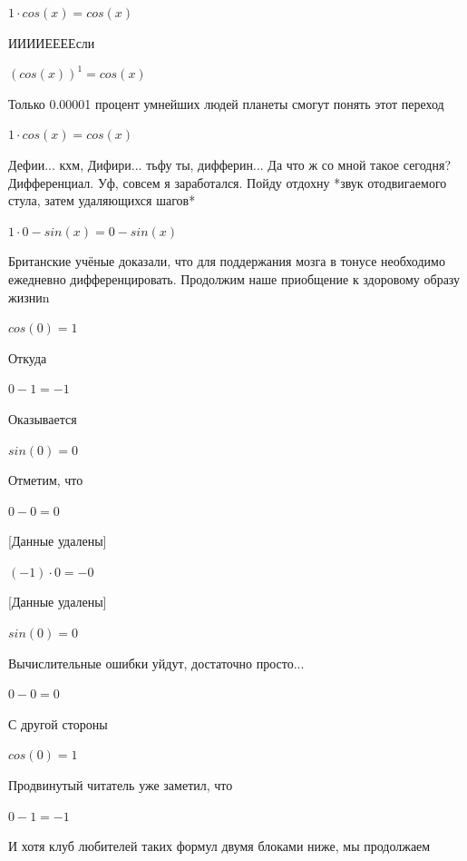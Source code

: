 \documentclass[12pt,a4paper,fleqn]{article}
\begin{document}
\begin{center}
$1 \cdot cos(x) = cos(x)$\end{center}
ИИИИЕЕЕЕсли\cite{link3}

\begin{center}
$(cos(x))^{1} = cos(x)$\end{center}
Только 0.00001 процент умнейших людей планеты смогут понять этот переход

\begin{center}
$1 \cdot cos(x) = cos(x)$\end{center}
Дефии... кхм, Дифири... тьфу ты, дифферин... Да что ж со мной такое сегодня? Дифференциал. Уф, совсем я заработался. Пойду отдохну *звук отодвигаемого стула, затем удаляющихся шагов*

\begin{center}
$1 \cdot 0-sin(x) = 0-sin(x)$\end{center}
Британские учёные доказали, что для поддержания мозга в тонусе необходимо ежедневно дифференцировать. Продолжим наше приобщение к здоровому образу жизниn

\begin{center}$cos(0) = 1$\end{center}
Откуда

\begin{center}$0-1 = -1$\end{center}
Оказывается

\begin{center}$sin(0) = 0$\end{center}
Отметим, что

\begin{center}$0-0 = 0$\end{center}
[Данные удалены]

\begin{center}$(-1) \cdot 0 = -0$\end{center}
[Данные удалены]

\begin{center}$sin(0) = 0$\end{center}
Вычислительные ошибки уйдут, достаточно просто...

\begin{center}$0-0 = 0$\end{center}
С другой стороны

\begin{center}$cos(0) = 1$\end{center}
Продвинутый читатель уже заметил, что

\begin{center}$0-1 = -1$\end{center}
И хотя клуб любителей таких формул двумя блоками ниже, мы продолжаем
\end{document}
